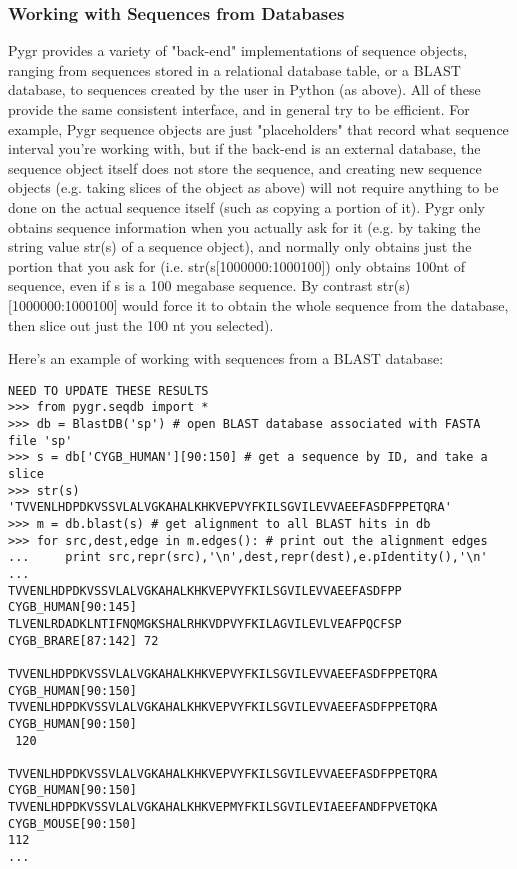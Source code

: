 \documentclass{howto}
\begin{document}
\subsubsection{Working with Sequences from Databases}

Pygr provides a variety of "back-end" implementations of sequence objects, ranging from sequences stored in a relational database table, or a BLAST database, to sequences created by the user in Python (as above).  All of these provide the same consistent interface, and in general try to be efficient.  For example, Pygr sequence objects are just "placeholders" that record what sequence interval you're working with, but if the back-end is an external database, the sequence object itself does not store the sequence, and creating new sequence objects (e.g. taking slices of the object as above) will not require anything to be done on the actual sequence itself (such as copying a portion of it).  Pygr only obtains sequence information when you actually ask for it (e.g. by taking the string value str(s) of a sequence object), and normally only obtains just the portion that you ask for (i.e. str(s[1000000:1000100]) only obtains 100nt of sequence, even if s is a 100 megabase sequence.  By contrast str(s)[1000000:1000100] would force it to obtain the whole sequence from the database, then slice out just the 100 nt you selected). 

Here's an example of working with sequences from a BLAST database:

\begin{verbatim}
NEED TO UPDATE THESE RESULTS
>>> from pygr.seqdb import *
>>> db = BlastDB('sp') # open BLAST database associated with FASTA file 'sp'
>>> s = db['CYGB_HUMAN'][90:150] # get a sequence by ID, and take a slice
>>> str(s)
'TVVENLHDPDKVSSVLALVGKAHALKHKVEPVYFKILSGVILEVVAEEFASDFPPETQRA'
>>> m = db.blast(s) # get alignment to all BLAST hits in db
>>> for src,dest,edge in m.edges(): # print out the alignment edges
...     print src,repr(src),'\n',dest,repr(dest),e.pIdentity(),'\n'
... 
TVVENLHDPDKVSSVLALVGKAHALKHKVEPVYFKILSGVILEVVAEEFASDFPP CYGB_HUMAN[90:145] 
TLVENLRDADKLNTIFNQMGKSHALRHKVDPVYFKILAGVILEVLVEAFPQCFSP CYGB_BRARE[87:142] 72

TVVENLHDPDKVSSVLALVGKAHALKHKVEPVYFKILSGVILEVVAEEFASDFPPETQRA CYGB_HUMAN[90:150] 
TVVENLHDPDKVSSVLALVGKAHALKHKVEPVYFKILSGVILEVVAEEFASDFPPETQRA CYGB_HUMAN[90:150]
 120

TVVENLHDPDKVSSVLALVGKAHALKHKVEPVYFKILSGVILEVVAEEFASDFPPETQRA CYGB_HUMAN[90:150] 
TVVENLHDPDKVSSVLALVGKAHALKHKVEPMYFKILSGVILEVIAEEFANDFPVETQKA CYGB_MOUSE[90:150]
112 
...
\end{verbatim}
\end{document}
